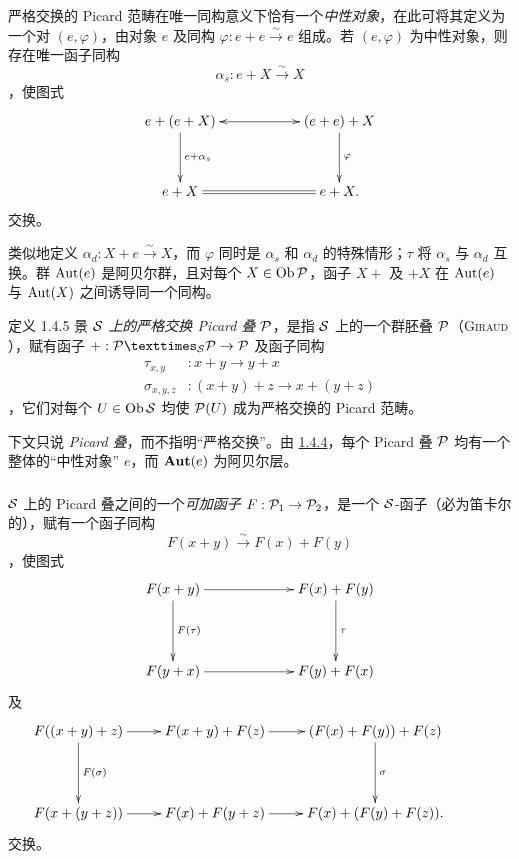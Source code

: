 \setcounter{subsubsection}{3} \subsubsection{} 严格交换的 Picard 范畴在唯一同构意义下恰有一个\emph{中性对象}，在此可将其定义为一个对 $(e,\varphi)$，由对象 $e$ 及同构 $\varphi:e+e\xrightarrow{\sim}e$ 组成。若 $(e,\varphi)$ 为中性对象，则存在唯一函子同构 $$
\alpha_{s}:e+X\xrightarrow{\sim} X
$$，使图式 $$
\xymatrix@C=2cm@R=1.25cm{
e + (e + X) \ar@{<->}[r] \ar[d]^{e+\alpha_s} & (e + e) + X \ar[d]^{\varphi}\\
e + X \ar@{=}[r]                       & e + X .
}
$$ 交换。

类似地\pageoriginale 定义 $\alpha_{d}:X+e\xrightarrow{\sim}X$，而 $\varphi$ 同时是 $\alpha_{s}$ 和 $\alpha_{d}$ 的特殊情形；$\tau$ 将 $\alpha_{s}$ 与 $\alpha_{d}$ 互换。群 $\operatorname{Aut}(e)$ 是阿贝尔群，且对每个 $X\in \operatorname{Ob}{\mathcal P}$，函子 $X+$ 及 $+X$ 在 $\operatorname{Aut}(e)$ 与 $\operatorname{Aut}(X)$ 之间诱导同一个同构。

\hypertarget{sga4.exp.XVIII.definition.1.4.5}{}\begin{enonce*}{定义 1.4.5} 景 ${\mathcal S}$ \emph{上的严格交换 Picard 叠 ${\mathcal P}$}，是指 ${\mathcal S}$ 上的一个群胚叠 ${\mathcal P}$（\textsc{Giraud} \cite{sga4.exp.XVIII.bib.1}），赋有函子 $+:\fprod{\Pp}{\Pp}{\Ss}\rightarrow \Pp$ 及函子同构 \begin{align*}
\tau_{x,y} &: x+y\longrightarrow y+x\\
\sigma_{x,y,z} &: (x+y)+z\longrightarrow x+(y+z)
\end{align*}，它们对每个 $U\in \operatorname{Ob} {\mathcal S}$ 均使 ${\mathcal P}(U)$ 成为严格交换的 Picard 范畴。 \end{enonce*}

下文只说 \emph{Picard 叠}，而不指明“严格交换”。由 \hyperref[XVIII.subsubsec1.4.4]{1.4.4}，每个 Picard 叠 ${\mathcal P}$ 均有一个整体的“中性对象” $e$，而 $\operatorname{\mathbf{Aut}}(e)$ 为阿贝尔层。

\setcounter{subsubsection}{5} \subsubsection{} ${\mathcal S}$ 上的 Picard 叠之间的一个\emph{可加函子} $F:{\mathcal P}_{1}\rightarrow
{\mathcal P}_{2}$，是一个 ${\mathcal S}$-函子（必为笛卡尔的），赋有一个函子同构 $$
F(x+y)\xrightarrow{\sim} F(x)+F(y)
$$，使图式 $$
\xymatrix@C=2.25cm@R=1.5cm{
F(x+y)  \ar[r] \ar[d]^{F(\tau)}& F(x) + F(y) \ar[d]^{\tau}\\
F(y+x)         \ar[r] & F(y) + F(x)
}
$$ 及 $$
\xymatrix@R=1.5cm{
  F((x+y)+z) \ar[r]\ar[d]^{F(\sigma)} & F(x+y)+F(z) \ar[r]&(F(x) + F(y)) + F(z)       \ar[d]^{\sigma}  &
\\
F(x + (y + z))    \ar[r]        & F(x) + F(y +z)  \ar[r] & F(x) + (F(y)
+ F(z)). 
}
$$ 交换。


